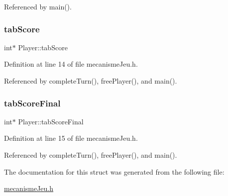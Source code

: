 Referenced by main().

\mbox{\label{structPlayer_a7d5c0f37c78c868e4721cc8ceece92a6}} 
\subsubsection{\texorpdfstring{tab\+Score}{tabScore}}
{\footnotesize\ttfamily int$\ast$ Player\+::tab\+Score}



Definition at line 14 of file mecanisme\+Jeu.\+h.



Referenced by complete\+Turn(), free\+Player(), and main().

\mbox{\label{structPlayer_a7c377df37ea43f041207fc4de5ac0a93}} 
\subsubsection{\texorpdfstring{tab\+Score\+Final}{tabScoreFinal}}
{\footnotesize\ttfamily int$\ast$ Player\+::tab\+Score\+Final}



Definition at line 15 of file mecanisme\+Jeu.\+h.



Referenced by complete\+Turn(), free\+Player(), and main().



The documentation for this struct was generated from the following file\+:\begin{DoxyCompactItemize}
\item 
\hyperlink{mecanismeJeu_8h}{mecanisme\+Jeu.\+h}\end{DoxyCompactItemize}
